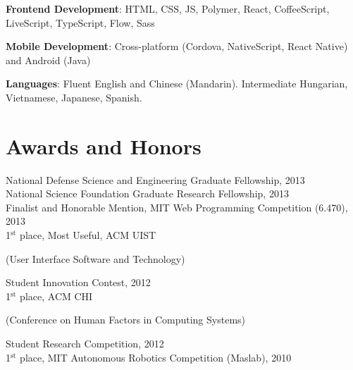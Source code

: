 \documentclass[margin,line]{resume}
\begin{document}
\begin{resume}
\textbf{Frontend Development}: HTML, CSS, JS, Polymer, React, CoffeeScript, LiveScript, TypeScript, Flow, Sass

\vspace{-4mm}

\textbf{Mobile Development}: Cross-platform (Cordova, NativeScript, React Native) and Android (Java)

\vspace{-4mm}

\textbf{Languages}: Fluent English and Chinese (Mandarin). Intermediate Hungarian, Vietnamese, Japanese, Spanish.

\pagebreak





\section{\mysidestyle Awards and Honors}

National Defense Science and Engineering Graduate Fellowship, 2013\\ %
National Science Foundation Graduate Research Fellowship, 2013\\ %
Finalist and Honorable Mention, MIT Web Programming Competition (6.470), 2013\\ %
1$^{\textrm{st}}$ place, Most Useful, ACM UIST \begin{small}(User Interface Software and Technology)\end{small} Student Innovation Contest, 2012\\
1$^{\textrm{st}}$ place, ACM CHI \begin{small}(Conference on Human Factors in Computing Systems)\end{small} Student Research Competition, 2012\\
1$^{\textrm{st}}$ place, MIT Autonomous Robotics Competition (Maslab), 2010


\end{resume}
\end{document}
